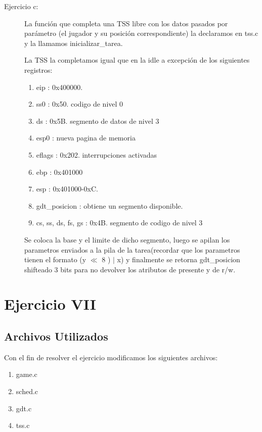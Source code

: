 \documentclass[a4paper]{article}
\begin{document}
\begin{description}
  \item[Ejercicio c:] La función que completa una TSS libre con los datos pasados por parámetro (el jugador y su posición correspondiente) la declaramos en tss.c y la llamamos inicializar_tarea.
  
  
  La TSS la completamos igual que en la idle a excepción de los siguientes registros:
  
  \begin{enumerate}
  \item eip : 0x400000.
  \item ss0    : 0x50. codigo de nivel 0
  \item ds     : 0x5B. segmento de datos de nivel 3
  \item esp0   : nueva pagina de memoria
  \item eflags : 0x202. interrupciones activadas
  \item ebp    : 0x401000
  \item esp    : 0x401000-0xC.
  \item gdt_posicion : obtiene un segmento disponible.
  \item cs, ss, ds, fs, gs : 0x4B. segmento de codigo de nivel 3
  
  \end{enumerate}
  
  Se coloca la base y el limite de dicho segmento, luego se apilan los parametros enviados a la pila de la tarea(recordar que los parametros tienen el formato (y $\ll$ 8 ) $\mathrel{|}$ x) y finalmente se retorna gdt_posicion shifteado 3 bits para no devolver los atributos de presente y de r/w.


\end{description}






\newpage

\section{Ejercicio VII}
\subsection{Archivos Utilizados}

Con el fin de resolver el ejercicio modificamos los siguientes archivos:

\begin{enumerate}

\item game.c
\item sched.c
\item gdt.c
\item tss.c

\end{enumerate}
\end{document}
